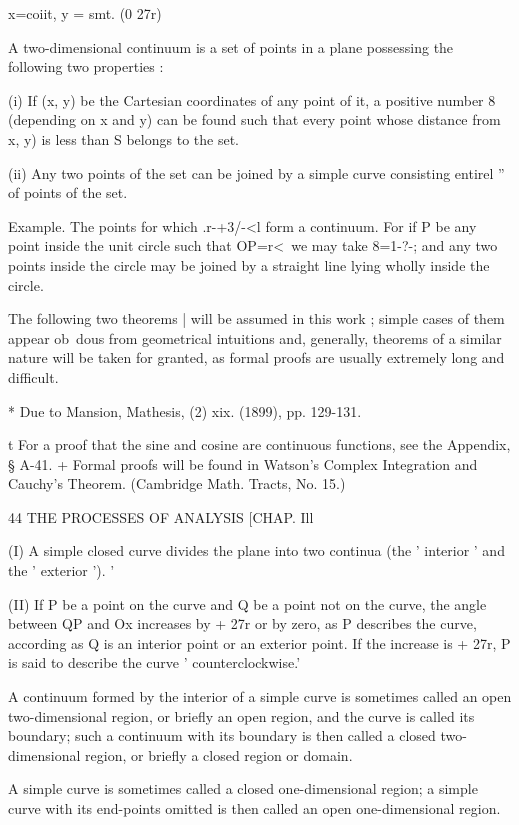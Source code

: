 x=coiit, y = smt. (0  27r) 

A two-dimensional continuum is a set of points in a plane possessing the 
following two properties : 

(i) If (x, y) be the Cartesian coordinates of any point of it, a positive 
number 8 (depending on x and y) can be found such that every point whose 
distance from  x, y) is less than S belongs to the set. 

(ii) Any two points of the set can be joined by a simple curve consisting 
entirel '' of points of the set. 

Example. The points for which .r-+3/-<l form a continuum. For if P be any 
point inside the unit circle such that OP=r<\, we may take 8=1-?-; and any two 
points inside the circle may be joined by a straight line lying wholly inside the circle. 

The following two theorems | will be assumed in this work ; simple cases 
of them appear ob\ dous from geometrical intuitions and, generally, theorems 
of a similar nature will be taken for granted, as formal proofs are usually 
extremely long and difficult. 

* Due to Mansion, Mathesis, (2) xix. (1899), pp. 129-131. 

t For a proof that the sine and cosine are continuous functions, see the Appendix, § A-41. 
+ Formal proofs will be found in Watson's Complex Integration and Cauchy's Theorem. 
(Cambridge Math. Tracts, No. 15.) 



44 THE PROCESSES OF ANALYSIS [CHAP. Ill 

(I) A simple closed curve divides the plane into two continua (the 
' interior ' and the ' exterior '). ' 

(II) If P be a point on the curve and Q be a point not on the curve, 
the angle between QP and Ox increases by + 27r or by zero, as P describes 
the curve, according as Q is an interior point or an exterior point. If the 
increase is + 27r, P is said to describe the curve ' counterclockwise.' 

A continuum formed by the interior of a simple curve is sometimes called 
an open two-dimensional region, or briefly an open region, and the curve is 
called its boundary; such a continuum with its boundary is then called a 
closed two-dimensional region, or briefly a closed region or domain. 

A simple curve is sometimes called a closed one-dimensional region; a 
simple curve with its end-points omitted is then called an open one-dimensional 
region. 

